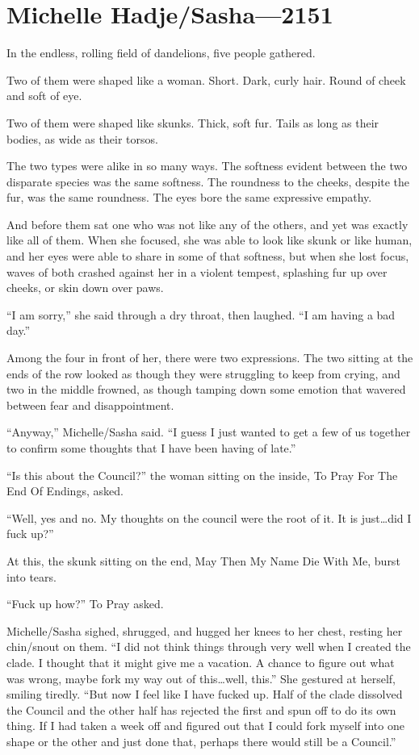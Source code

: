 \hypertarget{michelle-hadjesasha-2151}{%
\chapter{Michelle Hadje/Sasha—2151}\label{michelle-hadjesasha-2151}}

In the endless, rolling field of dandelions, five people gathered.

Two of them were shaped like a woman. Short. Dark, curly hair. Round of cheek and soft of eye.

Two of them were shaped like skunks. Thick, soft fur. Tails as long as their bodies, as wide as their torsos.

The two types were alike in so many ways. The softness evident between the two disparate species was the same softness. The roundness to the cheeks, despite the fur, was the same roundness. The eyes bore the same expressive empathy.

And before them sat one who was not like any of the others, and yet was exactly like all of them. When she focused, she was able to look like skunk or like human, and her eyes were able to share in some of that softness, but when she lost focus, waves of both crashed against her in a violent tempest, splashing fur up over cheeks, or skin down over paws.

``I am sorry,'' she said through a dry throat, then laughed. ``I am having a bad day.''

Among the four in front of her, there were two expressions. The two sitting at the ends of the row looked as though they were struggling to keep from crying, and two in the middle frowned, as though tamping down some emotion that wavered between fear and disappointment.

``Anyway,'' Michelle/Sasha said. ``I guess I just wanted to get a few of us together to confirm some thoughts that I have been having of late.''

``Is this about the Council?'' the woman sitting on the inside, To Pray For The End Of Endings, asked.

``Well, yes and no. My thoughts on the council were the root of it. It is just\ldots did I fuck up?''

At this, the skunk sitting on the end, May Then My Name Die With Me, burst into tears.

``Fuck up how?'' To Pray asked.

Michelle/Sasha sighed, shrugged, and hugged her knees to her chest, resting her chin/snout on them. ``I did not think things through very well when I created the clade. I thought that it might give me a vacation. A chance to figure out what was wrong, maybe fork my way out of this\ldots well, this.'' She gestured at herself, smiling tiredly. ``But now I feel like I have fucked up. Half of the clade dissolved the Council and the other half has rejected the first and spun off to do its own thing. If I had taken a week off and figured out that I could fork myself into one shape or the other and just done that, perhaps there would still be a Council.''

